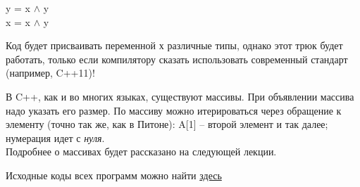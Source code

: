 \begin{lecture}[\lectureSubject]
\begin{lecSection}
\begin{enumerate}
			y = x $\wedge$ y \\
			x = x $\wedge$ y \\
		\end{enumerate}
	\end{lecSection}
	\begin{lecSection}
		Код будет присваивать переменной х различные типы, однако этот трюк будет работать, только если компилятору сказать использовать современный стандарт (например, C++11)!
	\end{lecSection}
	
	\begin{lecSection}
		В C++, как и во многих языках, существуют массивы.
		При объявлении массива надо указать его размер. По массиву можно итерироваться через обращение к элементу (точно так же, как в Питоне): A[1] -- второй элемент и так далее; нумерация идет с \textit{нуля}.\\
		 Подробнее о массивах будет рассказано на следующей лекции.
	\end{lecSection}
	
			\begin{center}
				{Исходные коды всех программ можно найти \href{https://github.com/alekseik1/cpp\_lections\_2017/tree/master/lection\%202}{здесь}}
			\end{center}
\end{lecture}

\renewcommand{\mainFolder}{/home/aleksei/github_projects/latex_works/informatics/3sem}
\renewcommand{\myFolder}{\mainFolder/lecture_\arabic{lectureNo}/}

\renewcommand{\lectureSubject}{Адреса и указатели}
%


